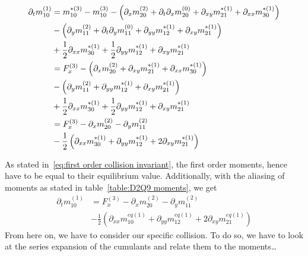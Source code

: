 \documentclass{article}
\begin{document}
\begin{align}
  \phantom{\partial_t m_{10}^{(1)}}
  &\begin{aligned}
  \nonumber
    \mathllap{\partial_t m_{10}^{(1)}} & =
    m_{10}^{*(3)} - m_{10}^{(3)}
    - \left(\partial_x m_{20}^{(2)} + \partial_t\partial_x m_{20}^{(0)} + \partial_{xy} m_{21}^{*(1)} + \partial_{xx} m_{30}^{*(1)}\right) \\
    &
    - \left(\partial_y m_{11}^{(2)} + \partial_t\partial_y m_{11}^{(0)} + \partial_{yy} m_{12}^{*(1)} + \partial_{xy} m_{21}^{*(1)}\right) \\
    &
    + \frac{1}{2}\partial_{xx} m_{30}^{*(1)} + \frac{1}{2} \partial_{yy} m_{12}^{*(1)} + \partial_{xy} m_{21}^{*(1)}
  \end{aligned} \\
  &\begin{aligned}
  \nonumber
   & =
    F_x^{(3)}
    - \left(\partial_x m_{20}^{(2)} + \partial_{xy} m_{21}^{*(1)} + \partial_{xx} m_{30}^{*(1)}\right) \\
    &
    - \left(\partial_y m_{11}^{(2)} + \partial_{yy} m_{12}^{*(1)} + \partial_{xy} m_{21}^{*(1)}\right) \\
    &
    + \frac{1}{2}\partial_{xx} m_{30}^{*(1)} + \frac{1}{2} \partial_{yy} m_{12}^{*(1)} + \partial_{xy} m_{21}^{*(1)}
  \end{aligned}\\
%
  &\begin{aligned}
  \nonumber
   & =
    F_x^{(3)}
    - \partial_x m_{20}^{(2)} - \partial_y m_{11}^{(2)}   \\
    &
    - \frac{1}{2} \left(\partial_{xx} m_{30}^{*(1)} + \partial_{yy} m_{12}^{*(1)} + 2\partial_{xy} m_{21}^{*(1)}\right)
  \end{aligned}
\end{align}

As stated in~\eqref{eq:first order collision invariant}, the first order moments, hence have to be equal to their equilibrium value. Additionally, with the aliasing of moments as stated in table~\ref{table:D2Q9 moments}, we get
\begin{equation}
  \begin{aligned}
  \partial_t m_{10}^{(1)}
   & =
    F_x^{(3)}
    - \partial_x m_{20}^{(2)} - \partial_y m_{11}^{(2)} \\
    &
    - \frac{1}{2} \left(\partial_{xx} m_{10}^{eq(1)} + \partial_{yy} m_{12}^{eq(1)} + 2\partial_{xy} m_{21}^{eq(1)}\right)
  \end{aligned}
\end{equation}
From here on, we have to consider our specific collision. To do so, we have to look at the series expansion of the cumulants and relate them to the moments\ldots
\end{document}
